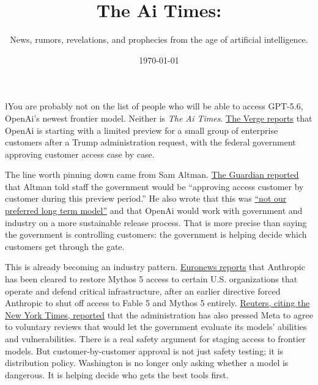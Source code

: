 \documentclass{news}
\title    {The Ai Times:}
\subtitle {News, rumors, revelations, and prophecies from the age of artificial intelligence.}
\date     {\today}
\begin{document}


{\l{Y}ou are probably not on the list of people who will be able to access GPT-5.6, OpenAi's newest frontier model. Neither is \textit{The Ai Times}. \href{https://www.theverge.com/ai-artificial-intelligence/957372/openai-will-delay-gpt-5-6-after-trump-administration-request}{The Verge reports} that OpenAi is starting with a limited preview for a small group of enterprise customers after a Trump administration request, with the federal government approving customer access case by case.
\par} 

The line worth pinning down came from Sam Altman. \href{https://www.theguardian.com/technology/2026/jun/26/openai-ai-model-release-trump-us-sam-altman-gpt-anthropic-mythos}{The Guardian reported} that Altman told staff the government would be ``approving access customer by customer during this preview period.'' He also wrote that this was \href{https://www.axios.com/2026/06/25/trump-administration-openai-gpt-model-release}{``not our preferred long term model''} and that OpenAi would work with government and industry on a more sustainable release process. That is more precise than saying the government is controlling customers: the government is helping decide which customers get through the gate.

This is already becoming an industry pattern. \href{https://www.euronews.com/2026/06/27/anthropic-cleared-to-restore-mythos-5-access-to-certain-us-organisations}{Euronews reports} that Anthropic has been cleared to restore Mythos 5 access to certain U.S. organizations that operate and defend critical infrastructure, after an earlier directive forced Anthropic to shut off access to Fable 5 and Mythos 5 entirely. \href{https://www.reuters.com/world/us/us-presses-meta-agree-ai-reviews-security-concerns-rise-nyt-reports-2026-06-23/}{Reuters, citing the New York Times, reported} that the administration has also pressed Meta to agree to voluntary reviews that would let the government evaluate its models' abilities and vulnerabilities. There is a real safety argument for staging access to frontier models. But customer-by-customer approval is not just safety testing; it is distribution policy. Washington is no longer only asking whether a model is dangerous. It is helping decide who gets the best tools first.
\end{document}
